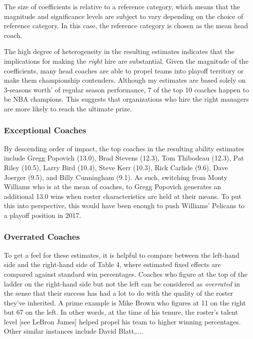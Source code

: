 \documentclass[main.tex]{subfiles}
\begin{document}
The size of coefficients is relative to a reference category, which means that the magnitude and significance levels are subject to vary depending on the choice of reference category. In this case, the reference category is chosen as the mean head coach. 

The high degree of heterogeneity in the resulting estimates indicates that the implications for making the \textit{right} hire are substantial. Given the magnitude of the coefficients, many head coaches are able to propel teams into playoff territory or make them championship contenders. Although my estimates are based solely on 3-seasons worth' of regular season performance, 7 of the top 10 coaches happen to be NBA champions. This suggests that organizations who hire the right managers are more likely to reach the ultimate prize. 

\subsubsection{Exceptional Coaches}

By descending order of impact, the top coaches in the resulting ability estimates include Gregg Popovich (13.0), Brad Stevens (12.3), Tom Thibodeau (12.3), Pat Riley (10.5), Larry Bird (10.4), Steve Kerr (10.3), Rick Carlisle (9.6), Dave Joerger (9.5), and Billy Cunningham (9.1). As such, switching from Monty Williams who is at the mean of coaches,  to Gregg Popovich generates an additional 13.0 wins when roster characteristics are held at their means. To put this into perspective, this would have been enough to push Williams’ Pelicans to a playoff position in 2017.

\subsubsection{Overrated Coaches}

To get a feel for these estimates, it is helpful to compare between the left-hand side and the right-hand side of Table 4, where estimated fixed effects are compared against standard win percentages. Coaches who figure at the top of the ladder on the right-hand side but not the left can be considered as \textit{overrated} in the sense that their success has had a lot to do with the quality of the roster they've inherited. A prime example is Mike Brown who figures at 11 on the right but 67 on the left. In other words, at the time of his tenure, the roster's talent level [see LeBron James] helped propel his team to higher winning percentages. Other similar instances include David Blatt,....
\end{document}
